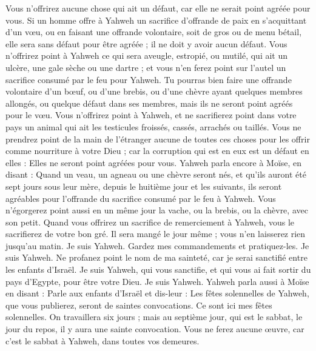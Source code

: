\begin{multicols}{2}
Vous n'offrirez aucune chose qui ait un défaut, car elle ne serait point agréée pour vous.
Si un homme offre à Yahweh un sacrifice d'offrande de paix en s'acquittant d'un vœu, ou en faisant une offrande volontaire, soit de gros ou de menu bétail, elle sera sans défaut pour être agréée ; il ne doit y avoir aucun défaut.
Vous n'offrirez point à Yahweh ce qui sera aveugle, estropié, ou mutilé, qui ait un ulcère, une gale sèche ou une dartre ; et vous n'en ferez point sur l'autel un sacrifice consumé par le feu pour Yahweh.
Tu pourras bien faire une offrande volontaire d'un bœuf, ou d'une brebis, ou d'une chèvre ayant quelques membres allongés, ou quelque défaut dans ses membres, mais ils ne seront point agréés pour le vœu.
Vous n'offrirez point à Yahweh, et ne sacrifierez point dans votre pays un animal qui ait les testicules froissés, cassés, arrachés ou taillés.
Vous ne prendrez point de la main de l'étranger aucune de toutes ces choses pour les offrir comme nourriture à votre Dieu ; car la corruption qui est en eux est un défaut en elles : Elles ne seront point agréées pour vous.
Yahweh parla encore à Moïse, en disant :
Quand un veau, un agneau ou une chèvre seront nés, et qu'ils auront été sept jours sous leur mère, depuis le huitième jour et les suivants, ils seront agréables pour l'offrande du sacrifice consumé par le feu à Yahweh.
Vous n'égorgerez point aussi en un même jour la vache, ou la brebis, ou la chèvre, avec son petit.
Quand vous offrirez un sacrifice de remerciement à Yahweh, vous le sacrifierez de votre bon gré.
Il sera mangé le jour même ; vous n'en laisserez rien jusqu'au matin. Je suis Yahweh.
Gardez mes commandements et pratiquez-les. Je suis Yahweh.
Ne profanez point le nom de ma sainteté, car je serai sanctifié entre les enfants d'Israël. Je suis Yahweh, qui vous sanctifie,
et qui vous ai fait sortir du pays d'Egypte, pour être votre Dieu. Je suis Yahweh.
\VerseOne{}Yahweh parla aussi à Moïse en disant :
Parle aux enfants d'Israël et dis-leur : Les fêtes solennelles de Yahweh, que vous publierez, seront de saintes convocations. Ce sont ici mes fêtes solennelles.
On travaillera six jours ; mais au septième jour, qui est le sabbat, le jour du repos, il y aura une sainte convocation. Vous ne ferez aucune œuvre, car c'est le sabbat à Yahweh, dans toutes vos demeures.

\end{multicols}
